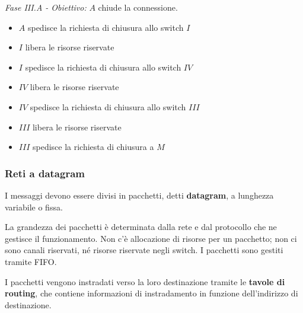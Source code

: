             \vspace{3mm}
            
            \textit{ Fase III.A - Obiettivo:} $A$ chiude la connessione.
            
            \begin{itemize}
                \item 
                    $A$ spedisce la richiesta di chiusura allo switch $I$
                
                \item
                    $I$ libera le risorse riservate
                    
                \item
                    $I$ spedisce la richiesta di chiusura allo switch $IV$
                    
                \item
                    $IV$ libera le risorse riservate
                    
                \item
                    $IV$ spedisce la richiesta di chiusura allo switch $III$
                    
                \item
                    $III$ libera le risorse riservate
                    
                \item
                    $III$ spedisce la richiesta di chiusura a $M$
            \end{itemize}
            
        \subsubsection{Reti a datagram}
        
            I messaggi devono essere divisi in pacchetti, detti \textbf{datagram}, a lunghezza variabile o fissa.
            
            La grandezza dei pacchetti è determinata dalla rete e dal protocollo che ne gestisce il funzionamento. Non c'è allocazione di risorse per un pacchetto; non ci sono canali riservati, né risorse riservate negli switch. I pacchetti sono gestiti tramite FIFO.
            
            \vspace{3mm}
            
            I pacchetti vengono instradati verso la loro destinazione tramite le \textbf{tavole di routing}, che contiene informazioni di instradamento in funzione dell'indirizzo di destinazione.
            
